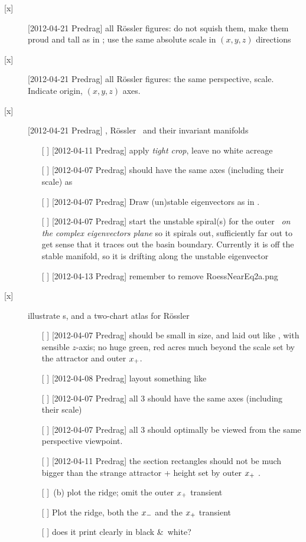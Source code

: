 \begin{description}
\item[{[x]}] [2012-04-21 Predrag] all R\"ossler figures: do not squish them, make them proud
        and tall as in ; use the same absolute scale
        in $(x,y,z)$ directions
\item[{[x]}] [2012-04-21 Predrag] all R\"ossler figures: the same perspective, scale. Indicate origin, $(x,y,z)$ axes.
\item[{[x]}] [2012-04-21 Predrag] ,
        R\"ossler \eqva\ and their invariant manifolds
    \begin{itemize}
        \item[{[ ]}] [2012-04-11 Predrag] apply \emph{tight crop}, leave no white acreage
        \item[{[ ]}] [2012-04-07 Predrag] should have the same axes
            (including their scale) as 
        \item[{[ ]}] [2012-04-07 Predrag] Draw (un)stable eigenvectors as
                in .
        \item[{[ ]}] [2012-04-07 Predrag] start the unstable spiral(s)
            for the outer \eqv\ \emph{on the complex eigenvectors plane}
            so it spirals out, sufficiently far out to get sense that it
            traces out the basin boundary. Currently it is off the stable
            manifold, so it is drifting along the unstable eigenvector
        \item[{[ ]}] [2012-04-13 Predrag] remember to remove RoessNearEq2a.png
    \end{itemize}

\item[{[x]}]
    illustrate \poincBord s, and a two-chart atlas for R\"ossler
    \begin{itemize}
        \item[{[ ]}] [2012-04-07 Predrag] should be small in size, and laid out like
            , with sensible $z$-axis; no huge green,
            red acres much beyond the scale set by the attractor and
            outer $x_{+}$.
        \item[{[ ]}] [2012-04-08 Predrag] layout something like 
        \item[{[ ]}] [2012-04-07 Predrag] all 3 should have the same axes
            (including their scale)
        \item[{[ ]}] [2012-04-07 Predrag] all 3 should optimally be viewed from the same
            perspective viewpoint.
        \item[{[ ]}] [2012-04-11 Predrag] the section rectangles should
            not be much bigger than the strange attractor + height set by
            outer  $x_{+}$ \eqv.
        \item[{[ ]}] \,(b) plot the ridge; omit the
            outer $x_{+}$ transient
        \item[{[ ]}]  Plot
            the ridge, both the $x_{-}$ and the $x_{+}$ transient
        \item[{[ ]}] does it print clearly in black \&\ white?
    \end{itemize}


\end{description}
